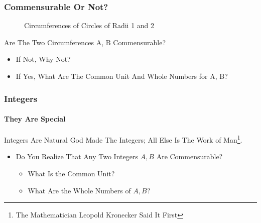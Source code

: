 \documentclass{beamer}
\begin{document}
\begin{frame}
\frametitle{Commensurable Or Not?}
\begin{figure}[H]
\caption{Circumferences of Circles of Radii 1 and 2}
\label{fig:1c2c}
\end{figure}
\pause
Are The Two \alert{Circumferences A, B} Commensurable?
\pause
\begin{itemize}
\item If Not, Why Not?
\pause
\item If Yes, What Are The Common Unit And Whole Numbers for A, B?
\end{itemize}
\end{frame}

\begin{frame}
\frametitle{Integers}
\framesubtitle{They Are Special}
\label{slide:integers}
\begin{block}{Integers Are Natural}
God Made The Integers; All Else Is The Work of Man\footnote{The Mathematician Leopold Kronecker Said It First}.
\end{block}
\pause
\begin{itemize}
\item Do You Realize That Any Two Integers $A,B$ Are Commensurable?
\begin{itemize}
\pause
\item What Is the Common Unit?
\pause
\item What Are the Whole Numbers of $A,B$?
\end{itemize}
\end{itemize}
\end{frame}
\end{document}
